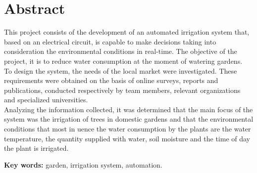 \chapter*{Abstract} %
 
This project consists of the development of an automated irrigation system that, based on an electrical circuit, is capable to make decisions taking into consideration the environmental conditions in real-time. The objective of the project, it is to reduce water consumption at the moment of watering gardens.\\
To design the system, the needs of the local market were investigated. These requirements were obtained on the basis of online surveys, reports and publications, conducted respectively by team members, relevant organizations and specialized universities.\\
Analyzing the information collected, it was determined that the main focus of the system was the irrigation of trees in domestic gardens and that the environmental conditions that most in uence the water consumption by the plants are the water temperature, the quantity supplied with water, soil moisture and the time of day the plant is irrigated.

\vspace{2.5cm}
\textbf{Key words:} garden, irrigation system, automation.
